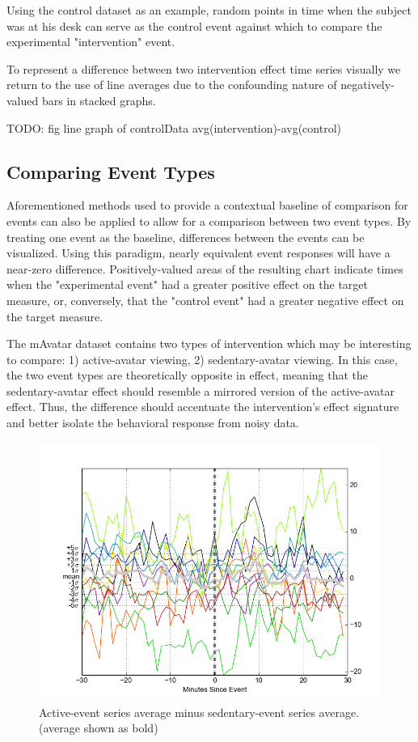 \documentclass[review,journal]{vgtc}         %
\begin{document}
Using the control dataset as an example, random points in time when the subject was at his desk can serve as the control event against which to compare the experimental "intervention" event.

To represent a difference between two intervention effect time series visually we return to the use of line averages due to the confounding nature of negatively-valued bars in stacked graphs.

TODO: fig line graph of controlData avg(intervention)-avg(control)


\subsection{Comparing Event Types}
Aforementioned methods used to provide a contextual baseline of comparison for events can also be applied to allow for a comparison between two event types.
By treating one event as the baseline, differences between the events can be visualized.
Using this paradigm, nearly equivalent event responses will have a near-zero difference.
Positively-valued areas of the resulting chart indicate times when the "experimental event" had a greater positive effect on the target measure, or, conversely, that the "control event" had a greater negative effect on the target measure.


The mAvatar dataset contains two types of intervention which may be interesting to compare: 1) active-avatar viewing, 2) sedentary-avatar viewing.
In this case, the two event types are theoretically opposite in effect, meaning that the sedentary-avatar effect should resemble a mirrored version of the active-avatar effect.
Thus, the difference should accentuate the intervention's effect signature and better isolate the behavioral response from noisy data.

\begin{figure}
\centering
\includegraphics[width=0.9\columnwidth]{./img/mAvatar_difference_events.png}
\caption{Active-event series average minus sedentary-event series average. (average shown as bold)}
\label{fig:mAvatarDifference}
\end{figure}
\end{document}
